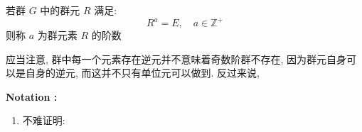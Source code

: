         \begin{Definition}[群元素的阶数]
            若群 $G$ 中的群元 $R$ 满足:
                \begin{equation}
                    R^{a} = E, \quad a \in \mathbb{Z}^{+}
                \end{equation}
            则称 $a$ 为群元素 $R$ 的阶数
        \end{Definition}
        \hspace*{2em} 应当注意, 群中每一个元素存在逆元并不意味着奇数阶群不存在, 因为群元自身可以是自身的逆元, 而这并不只有单位元可以做到. 反过来说, 

        \textbf{Notation :}
        \begin{enumerate}
            \item 不难证明: 
        \end{enumerate}
